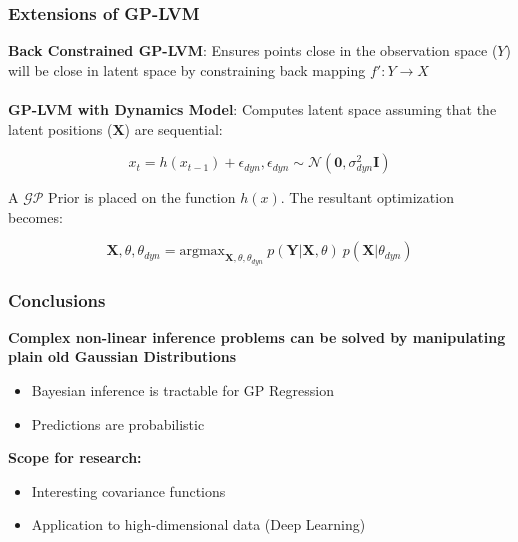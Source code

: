 \documentclass[10pt]{beamer}
\begin{document}
  \begin{frame}
  \frametitle{Extensions of GP-LVM}

  \textbf{Back Constrained GP-LVM}: Ensures points close in the observation space ($Y$) will be close in latent space by constraining back mapping $f': Y \rightarrow X$\\~\\

  \textbf{GP-LVM with Dynamics Model}: Computes latent space assuming that the latent positions ($\mathbf{X}$) are sequential:

  \begin{equation}
    x_t = h(x_{t-1}) + \epsilon_{dyn}, \epsilon_{dyn} \sim \mathcal{N}(\mathbf{0},\sigma^2_{dyn}\mathbf{I})
  \end{equation}

  A $\mathcal{GP}$ Prior is placed on the function $h(x)$. The resultant optimization becomes:

  \begin{equation}
    \mathbf{X},\theta,\theta_{dyn} = \text{argmax}_{\mathbf{X},\theta,\theta_{dyn}}~p(\mathbf{Y}|\mathbf{X},\theta)~p(\mathbf{X}|\theta_{dyn})
  \end{equation}

  \end{frame}

  \begin{frame}
    \frametitle{Conclusions}

    \textbf{Complex non-linear inference problems can be solved by manipulating plain old Gaussian Distributions}

    \begin{itemize}
      \item Bayesian inference is tractable for GP Regression
      \item Predictions are probabilistic
    \end{itemize}

    \textbf{Scope for research:}

    \begin{itemize}
      \item Interesting covariance functions
      \item Application to high-dimensional data (Deep Learning)
    \end{itemize}

  \end{frame}
\end{document}
